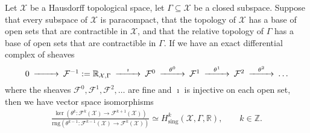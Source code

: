 \documentclass[10pt,a4paper]{amsart}
\theoremstyle{definition}
\theoremstyle{remark}
\numberwithin{equation}{section}
\newcommand{\bbR}{{\mathbb R}}
\newcommand{\bbZ}{{\mathbb Z}}
\newcommand{\calF}{{\mathcal F}}
\newcommand{\calX}{{\mathcal X}}
\newcommand{\rng}{\mathrm{rng}}
\begin{document}
\begin{theorem}\label{theorem:resolution-of-locally-constant-functions}
    Let $\calX$ be a Hausdorff topological space, let $\Gamma \subseteq \calX$ be a closed subspace.
    Suppose that every subspace of $\calX$ is paracompact,
    that the topology of $\calX$ has a base of open sets that are contractible in $\calX$,
    and 
    that the relative topology of $\Gamma$ has a base of open sets that are contractible in $\Gamma$.
    If we have an exact differential complex of sheaves 
    \begin{align}\label{math:resolution-of-locally-constant-functions}
        \begin{CD}
            0
            @>>>
            \calF^{-1}
            :=
            \bbR_{\calX,\Gamma}
            @>{\imath}>>
            \calF^{0}
            @>{\theta^{0}}>>
            \calF^{1}
            @>{\theta^{1}}>>
            \calF^{2}
            @>{\theta^{2}}>>
            \dots 
        \end{CD}
    \end{align}
    where the sheaves $\calF^{0}, \calF^{1}, \calF^{2}, \dots$ are fine and $\imath$ is injective on each open set, 
then we have vector space isomorphisms 
    \begin{align*}
        \frac{ 
            \ker\left( \theta^{k} : \calF^{k}(\calX) \to \calF^{k+1}(\calX) \right)
        }{
            \rng\left( \theta^{k-1} : \calF^{k-1}(\calX) \to \calF^{k}(\calX) \right)
        } 
        \simeq 
        H^{k}_{\mathrm{sing}}(\calX,\Gamma,\bbR)
        ,
        \qquad 
        k \in \bbZ
        .
    \end{align*}
\end{theorem}
\end{document}

